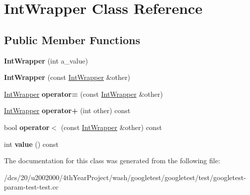 \hypertarget{classIntWrapper}{}\section{Int\+Wrapper Class Reference}
\label{classIntWrapper}
\subsection*{Public Member Functions}
\begin{DoxyCompactItemize}
\item 
\mbox{\label{classIntWrapper_a1d35e0d0b9c0fc109a8d2a2118ae6010}} 
{\bfseries Int\+Wrapper} (int a\+\_\+value)
\item 
\mbox{\label{classIntWrapper_af23efe3c8d8bf176948922b41e8f253e}} 
{\bfseries Int\+Wrapper} (const \mbox{\hyperlink{classIntWrapper}{Int\+Wrapper}} \&other)
\item 
\mbox{\label{classIntWrapper_a39077b3c0eb1dd8a296a81bfb0a047b3}} 
\mbox{\hyperlink{classIntWrapper}{Int\+Wrapper}} {\bfseries operator=} (const \mbox{\hyperlink{classIntWrapper}{Int\+Wrapper}} \&other)
\item 
\mbox{\label{classIntWrapper_abf97bd11dd2825f3cb9e4d9f48152b56}} 
\mbox{\hyperlink{classIntWrapper}{Int\+Wrapper}} {\bfseries operator+} (int other) const
\item 
\mbox{\label{classIntWrapper_a940fd2978cdf7849281f11b32df94163}} 
bool {\bfseries operator$<$} (const \mbox{\hyperlink{classIntWrapper}{Int\+Wrapper}} \&other) const
\item 
\mbox{\label{classIntWrapper_a6103e9dc5eb94678985e3c2ac481b508}} 
int {\bfseries value} () const
\end{DoxyCompactItemize}


The documentation for this class was generated from the following file\+:\begin{DoxyCompactItemize}
\item 
/dcs/20/u2002000/4th\+Year\+Project/wash/googletest/googletest/test/googletest-\/param-\/test-\/test.\+cc\end{DoxyCompactItemize}

